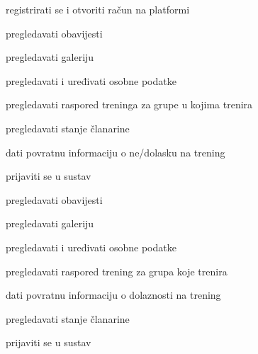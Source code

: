 \documentclass[times, utf8, zavrsni]{fer}
\newenvironment{packed_enum}{
	\begin{enumerate}
		\setlength{\itemsep}{0pt}
		\setlength{\parskip}{0pt}
		\setlength{\parsep}{0pt}
	}{\end{enumerate}}
\begin{document}
			
			\begin{packed_enum}
				\item  {}
				
				\begin{packed_enum}
					
					\item registrirati se i otvoriti račun na platformi
					
				\end{packed_enum}
			
				\item  {}
				
				\begin{packed_enum}
					
					\item pregledavati obavijesti
					\item pregledavati galeriju
					\item pregledavati i uređivati osobne podatke
					\item pregledavati raspored treninga za grupe u kojima trenira
					\item pregledavati stanje članarine
					\item dati povratnu informaciju o ne/dolasku na trening
					\item prijaviti se u sustav
					
				\end{packed_enum}
			
				\item  {}
				
				\begin{packed_enum}
					
					\item pregledavati obavijesti
					\item pregledavati galeriju
					\item pregledavati i uređivati osobne podatke
					\item pregledavati raspored trening za grupa koje trenira
					\item dati povratnu informaciju o dolaznosti na trening
					\item pregledavati stanje članarine
					\item prijaviti se u sustav
					
				\end{packed_enum}
			
				\item  {}
				

\end{packed_enum}
\end{document}
